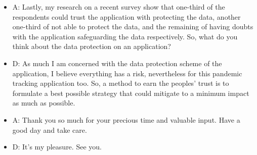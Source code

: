 \begin{itemize}
    \item A: Lastly, my research on a recent survey show that one-third of the respondents could trust the
    application with protecting the data, another one-third of not able to protect the data, and the
    remaining of having doubts with the application safeguarding the data respectively. So, what
    do you think about the data protection on an application?
    \item D: As much I am concerned with the data protection scheme of the application, I believe
    everything has a risk, nevertheless for this pandemic tracking application too. So, a method to
    earn the peoples’ trust is to formulate a best possible strategy that could mitigate to a minimum
    impact as much as possible.
    \item A: Thank you so much for your precious time and valuable input. Have a good day and take care.
    \item D: It’s my pleasure. See you.
  \end{itemize}